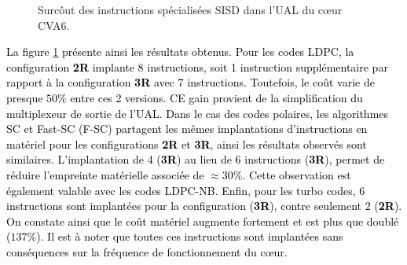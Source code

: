 \documentclass[../main.tex]{subfiles}
\begin{document}
\begin{figure}
    \center
    \caption{Surcôut des instructions spécialisées SISD dans l'UAL du cœur CVA6.}
    \label{tikz:alu_sisd}
\end{figure}
\textcolor{black}{La figure \ref{tikz:alu_sisd} présente ainsi les résultats obtenus. 
Pour les codes LDPC, la configuration \textbf{2R} implante 8 instructions, soit 1 instruction supplémentaire par rapport à la configuration \textbf{3R} avec 7 instructions. Toutefois, le coût varie de presque $50\%$ entre ces 2 versions. CE gain provient de la simplification du multiplexeur de sortie de l'UAL.
Dans le cas des codes polaires, les algorithmes SC et Fast-SC (F-SC) partagent les mêmes implantations d'instructions en matériel pour les configurations \textbf{2R} et \textbf{3R}, ainsi les résultats observés sont similaires. L'implantation de 4 (\textbf{3R}) au lieu de 6 instructions (\textbf{3R}), permet de réduire l'empreinte matérielle associée de $\approx 30\%$.
Cette observation est également valable avec les codes LDPC-NB.
Enfin, pour les turbo codes, 6 instructions sont implantées pour la configuration (\textbf{3R}), contre seulement 2 (\textbf{2R}). On constate ainsi que le coût matériel augmente fortement et est plus que doublé ($137\%$). 
Il est à noter que toutes ces instructions sont implantées sans conséquences sur la fréquence de fonctionnement du cœur.}
\end{document}
